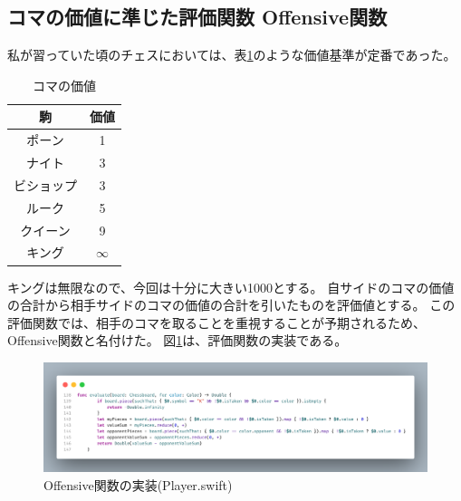 \documentclass[12pt, a4paper, uplatex]{jsarticle}
\begin{document}
\subsection{コマの価値に準じた評価関数 Offensive関数}
私が習っていた頃のチェスにおいては、表\ref*{tab:piece_value}のような価値基準が定番であった。
\begin{table}
  \centering
  \caption{コマの価値}\label{tab:piece_value}
  \begin{tabular}{|c|c|}
    \hline
    駒     & 価値       \\
    \hline
    ポーン   & 1        \\
    ナイト   & 3        \\
    ビショップ & 3        \\
    ルーク   & 5        \\
    クイーン  & 9        \\
    キング   & $\infty$ \\
    \hline
  \end{tabular}
\end{table}
キングは無限なので、今回は十分に大きい1000とする。
自サイドのコマの価値の合計から相手サイドのコマの価値の合計を引いたものを評価値とする。
この評価関数では、相手のコマを取ることを重視することが予期されるため、
Offensive関数と名付けた。
図\ref{fig:offensive}は、評価関数の実装である。
\begin{figure}
  [h]
  \centering
  \includegraphics[width=\textwidth]{OffensiveEvaluator.png}
  \caption{Offensive関数の実装(Player.swift)}\label{fig:offensive}
\end{figure}
\end{document}
